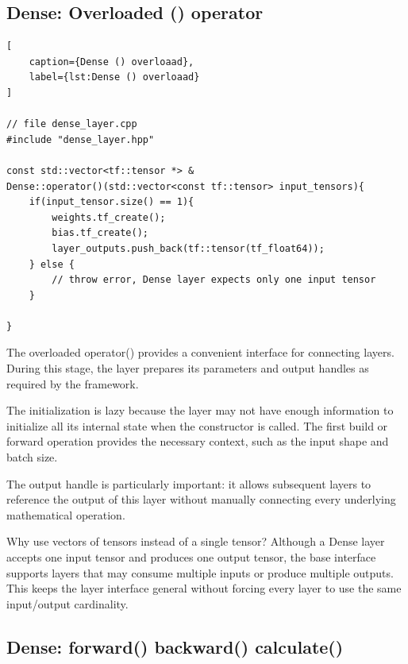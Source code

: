 \subsection{Dense: Overloaded () operator}


\begin{lstlisting}[
    caption={Dense () overloaad},
    label={lst:Dense () overloaad}
]

// file dense_layer.cpp
#include "dense_layer.hpp"

const std::vector<tf::tensor *> &
Dense::operator()(std::vector<const tf::tensor> input_tensors){
    if(input_tensor.size() == 1){
        weights.tf_create();
        bias.tf_create();
        layer_outputs.push_back(tf::tensor(tf_float64));
    } else {
        // throw error, Dense layer expects only one input tensor
    }

}
\end{lstlisting}

The overloaded operator() provides a convenient
interface for connecting layers. During this
stage, the layer prepares its parameters and
output handles as required by the framework.

The initialization is lazy because the layer
may not have enough information to initialize
all its internal state when the constructor
is called. The first build or forward operation
provides the necessary context, such as the
input shape and batch size.

The output handle is particularly important:
it allows subsequent layers to reference the
output of this layer without manually
connecting every underlying mathematical
operation.

Why use vectors of tensors instead of a single
tensor? Although a Dense layer accepts one input
tensor and produces one output tensor, the base
interface supports layers that may consume
multiple inputs or produce multiple outputs.
This keeps the layer interface general without
forcing every layer to use the same input/output
cardinality.


\subsection{Dense: forward() backward() calculate()}

